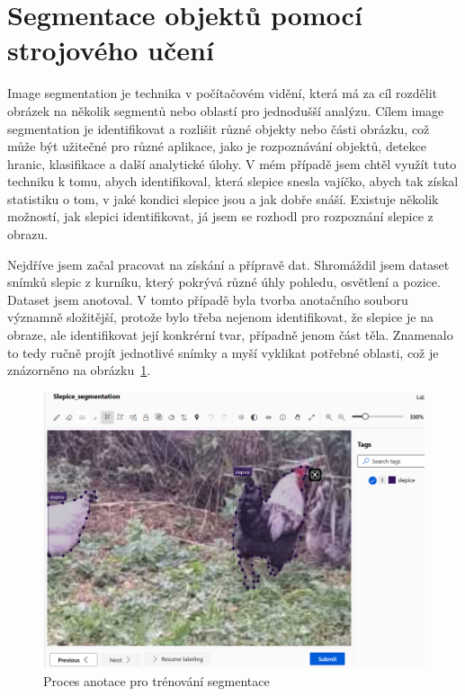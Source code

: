 \section{Segmentace objektů pomocí strojového učení}\label{sec:klasifikace-a-segmentace-objektu-pomoci-strojoveho-uceni}

Image segmentation je technika v počítačovém vidění, která má za cíl rozdělit obrázek na několik segmentů nebo oblastí pro jednodušší analýzu.
Cílem image segmentation je identifikovat a rozlišit různé objekty nebo části obrázku, což může být užitečné pro různé aplikace, jako je rozpoznávání objektů, detekce hranic, klasifikace a další analytické úlohy.
V mém případě jsem chtěl využít tuto techniku k tomu, abych identifikoval, která slepice snesla vajíčko, abych tak získal statistiku o tom, v jaké kondici slepice jsou a jak dobře snáší.
Existuje několik možností, jak slepici identifikovat, já jsem se rozhodl pro rozpoznání slepice z obrazu.

Nejdříve jsem začal pracovat na získání a přípravě dat.
Shromáždil jsem dataset snímků slepic z kurníku, který pokrývá různé úhly pohledu, osvětlení a pozice.
Dataset jsem anotoval.
V tomto případě byla tvorba anotačního souboru významně složitější, protože bylo třeba nejenom identifikovat, že slepice je na obraze, ale identifikovat její konkrérní tvar, případně jenom část těla.
Znamenalo to tedy ručně projít jednotlivé snímky a myší vyklikat potřebné oblasti, což je znázorněno na obrázku~\ref{fig:label_segmentation}.
\begin{figure}[H]
    \centering
    \includegraphics[width=1.0\textwidth]{img/label_segmentation}
    \caption{Proces anotace pro trénování segmentace}
    \label{fig:label_segmentation}
\end{figure}

